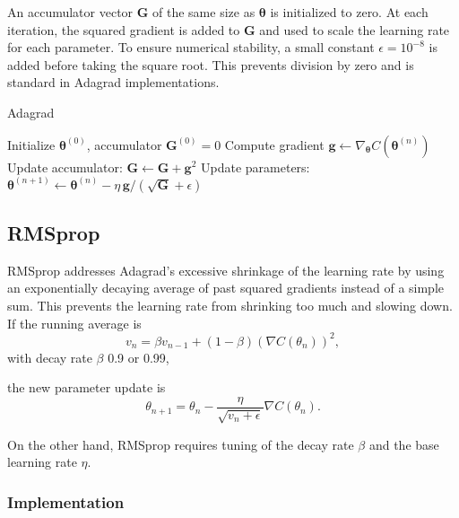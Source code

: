 \documentclass[
 reprint,            %
 amsmath,amssymb,
 aps,
]{revtex4-2}
\begin{document}
An accumulator vector $\mathbf{G}$ of the same size as $\boldsymbol{\theta}$ is initialized to zero.
At each iteration, the squared gradient is added to $\mathbf{G}$ and used to scale the learning rate for each parameter.
To ensure numerical stability, a small constant $\epsilon=10^{-8}$ is added before taking the square root.
This prevents division by zero and is standard in Adagrad implementations.
\begin{algorithm}[H]
\caption{Adagrad}
\begin{algorithmic}[1]
\State Initialize $\boldsymbol{\theta}^{(0)}$, accumulator $\mathbf{G}^{(0)}=0$
\State Compute gradient $\mathbf{g} \gets \nabla_{\boldsymbol{\theta}} C(\boldsymbol{\theta}^{(n)})$
\State Update accumulator: $\mathbf{G} \gets \mathbf{G} + \mathbf{g}^2$
\State Update parameters: $\boldsymbol{\theta}^{(n+1)} \gets \boldsymbol{\theta}^{(n)} - \eta \, \mathbf{g} / (\sqrt{\mathbf{G}}+\epsilon)$
\EndFor
\end{algorithmic}
\end{algorithm}

\subsection{RMSprop}

RMSprop addresses Adagrad's excessive shrinkage of the learning rate by using an exponentially decaying average of past squared gradients instead of a simple sum\cite{hjorthjensen_week37}.
This prevents the learning rate from shrinking too much and slowing down.  
If the running average is
\[
v_n = \beta v_{n-1} + (1 - \beta)\left( \nabla C(\theta_n) \right)^2,
\]
with decay rate \(\beta\) 0.9 or 0.99,

the new parameter update is
\[\theta_{n+1} = \theta_n - \frac{\eta}{\sqrt{v_n + \epsilon}} \nabla C(\theta_n).
\]

On the other hand, RMSprop requires tuning of the decay rate \(\beta\) and the base learning rate \(\eta\). \cite{goodfellow2016}

\subsubsection{Implementation}
\end{document}
